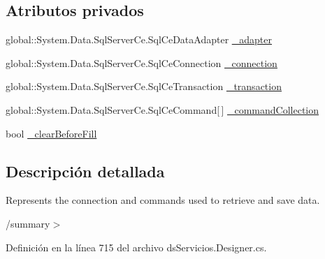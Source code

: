 \subsection*{Atributos privados}
\begin{DoxyCompactItemize}
\item 
global\-::\-System.\-Data.\-Sql\-Server\-Ce.\-Sql\-Ce\-Data\-Adapter \hyperlink{class_proyecto___integrador__3_1_1ds_servicios_table_adapters_1_1_servicios_table_adapter_adef36d1c06bafba740cd2cb94515689b}{\-\_\-adapter}
\item 
global\-::\-System.\-Data.\-Sql\-Server\-Ce.\-Sql\-Ce\-Connection \hyperlink{class_proyecto___integrador__3_1_1ds_servicios_table_adapters_1_1_servicios_table_adapter_a61b17efa7b400219260090a16bfccff3}{\-\_\-connection}
\item 
global\-::\-System.\-Data.\-Sql\-Server\-Ce.\-Sql\-Ce\-Transaction \hyperlink{class_proyecto___integrador__3_1_1ds_servicios_table_adapters_1_1_servicios_table_adapter_ab5265bf458c29343cad2cc1c7f49da90}{\-\_\-transaction}
\item 
global\-::\-System.\-Data.\-Sql\-Server\-Ce.\-Sql\-Ce\-Command\mbox{[}$\,$\mbox{]} \hyperlink{class_proyecto___integrador__3_1_1ds_servicios_table_adapters_1_1_servicios_table_adapter_a1dce748dfee4379f6fb18ac2d87c3e5b}{\-\_\-command\-Collection}
\item 
bool \hyperlink{class_proyecto___integrador__3_1_1ds_servicios_table_adapters_1_1_servicios_table_adapter_af7f5af5748748a7cb81b440aab054f0e}{\-\_\-clear\-Before\-Fill}
\end{DoxyCompactItemize}


\subsection{Descripción detallada}
Represents the connection and commands used to retrieve and save data. 

/summary$>$ 

Definición en la línea 715 del archivo ds\-Servicios.\-Designer.\-cs.



